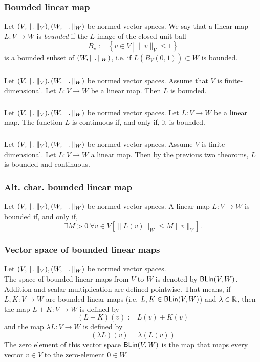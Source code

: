 \subsubsection*{Bounded linear map}
\udef Let $(V, \norm_V), (W, \norm_W)$ be normed vector spaces. We say that a linear
map $L : V \to W$ is \emph{bounded} if the $L$-image of the closed unit ball
\[
    \bar{B}_v := \left\{ v \in V \middle| \| v \|_V \leq 1 \right\}
\]
is a bounded subset of $(W, \norm_W)$, i.e. if
$L(\bar{B}_V(0,1)) \subset W$ is bounded.

\subsubsection*{}
\uthm Let $(V, \norm_V), (W, \norm_W)$ be normed vector spaces.
Assume that $V$ is finite-dimensional. Let $L : V \to W$ be a linear map.
Then $L$ is bounded.

\subsubsection*{}
\uthm Let $(V, \norm_V), (W, \norm_W)$ be normed vector spaces.
Let $L : V \to W$ be a linear map. The function $L$ is continuous if, and only if,
it is bounded.

\subsubsection*{}
\uprop Let $(V, \norm_V), (W, \norm_W)$ be normed vector spaces.
Assume $V$ is finite-dimensional. Let $L : V \to W$ a linear map.
Then by the previous two theoroms, $L$ is bounded and continuous.

\subsubsection*{Alt. char. bounded linear map}
\uprop Let $(V, \norm_V), (W, \norm_W)$ be normed vector spaces. A linear map
$L : V \to W$ is bounded if, and only if,
\[
    \exists M > 0\ \forall v \in V \left[ \| L(v) \|_W \leq M \| v \|_V \right].
\]

\subsubsection*{Vector space of bounded linear maps}
\udef Let $(V, \norm_V), (W, \norm_W)$ be normed vector spaces.\\
The space of bounded linear maps from $V$ to $W$ is denoted by $\mathsf{BLin}(V, W)$.
Addition and scalar multiplication are defined pointwise. That means,
if $L, K : V \to W$ are bounded linear maps (i.e. $L,K \in \mathsf{BLin}(V,W)$) and
$\lambda \in \mathbb{R}$, then the map $L + K : V \to W$ is defined by
\[
    (L + K)(v) := L(v) + K(v)
\]
and the map $\lambda L : V \to W$ is defined by
\[
    (\lambda L)(v) = \lambda (L(v))
\]
The zero element of this vector space $\mathsf{BLin}(V,W)$ is the map that maps
every vector $v \in V$ to the zero-element $0 \in W$.


